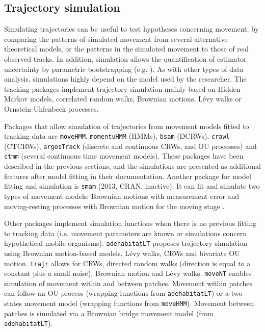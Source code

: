 \documentclass[a4paper,12pt]{article}
\newcommand{\Rpkg}[1]{\texttt{#1}}
\begin{document}
\subsection*{Trajectory simulation} 

Simulating trajectories can be useful to test hypotheses concerning movement, by comparing the patterns of simulated movement from several alternative theoretical models, or the patterns in the simulated movement to those of real observed tracks. In addition, simulation allows the quantification of estimator uncertainty by parametric bootstrapping (e.g. \cite{Michelot2016}). As with other types of data analysis, simulations highly depend on the model used by the researcher. 
The tracking packages implement trajectory simulation mainly based on Hidden Markov models, correlated random walks, Brownian motions, L\'evy walks or Ornstein-Uhlenbeck processes. %

Packages that allow simulation of trajectories from movement models fitted to tracking data are \Rpkg{moveHMM}, \Rpkg{momentuHMM} (HMMs), \Rpkg{bsam} (DCRWs), \Rpkg{crawl} (CTCRWs), \Rpkg{argosTrack} (discrete and continuous CRWs, and OU processes) and \Rpkg{ctmm} (several continuous time movement models). These packages have been described in the previous sections, and the simulations are presented as additional features after model fitting in their documentation. Another package for model fitting and simulation is \Rpkg{smam} (2013, CRAN, inactive). It can fit and simulate two types of movement models: Brownian motions with measurement error \citep{Pozdnyakov2014} and moving-resting processes with Brownian motion for the moving stage \citep{Yan2014}.

Other packages implement simulation functions when there is no previous fitting to tracking data (i.e. movement parameters are known or simulations concern hypothetical mobile organisms). \Rpkg{adehabitatLT} proposes trajectory simulation using Brownian motion-based models, L\'evy walks, CRWs and bivariate OU motion. \Rpkg{trajr} allows for CRWs, directed random walks (direction is equal to a constant plus a small noise), Brownian motion and L\'evy walks. \Rpkg{moveNT} enables simulation of movement within and between patches. Movement within patches can follow an OU process (wrapping functions from \Rpkg{adehabitatLT}) or a two-states movement model (wrapping functions from \Rpkg{moveHMM}). Movement between patches is simulated via a Brownian bridge movement model (from \Rpkg{adehabitatLT}). 
\end{document}

